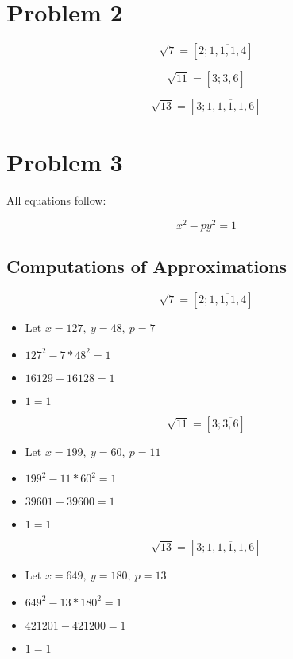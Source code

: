 \documentclass[]{report}
\begin{document}
\section{Problem 2}

$$ \sqrt{7} = [2; \overline{1, 1, 1, 4}] $$


$$ \sqrt{11} = [3; \overline{3, 6}] $$


$$ \sqrt{13} = [3;  \overline{1, 1, 1, 1, 6}] $$








\section{Problem 3}

All equations follow:

$$ x^2 - p y^2 = 1$$

\subsection{Computations of Approximations}

	$$ \sqrt{7} = [2; \overline{1, 1, 1, 4}] $$
\begin{itemize}

	
	\item Let $x = 127, \ y = 48, \ p = 7$

	\item $127^2 - 7 * 48^2 = 1$
	
	\item $ 16129 - 16128 = 1$
	
	\item $ 1 = 1$
	
\end{itemize}

 $$ \sqrt{11} = [3; \overline{3, 6}] $$

\begin{itemize}
	
	 	\item Let $x = 199, \ y = 60, \ p = 11$
	 
	 \item $199^2 - 11 * 60^2 = 1$
	 
	 \item $ 39601 - 39600 = 1$
	 
	 \item $ 1 = 1$
	 
\end{itemize}

 
	 
	 $$ \sqrt{13} = [3;  \overline{1, 1, 1, 1, 6}] $$

\begin{itemize}
	
	 	 
	 \item Let $x = 649, \ y = 180, \ p = 13$
	 
	 \item $649^2 - 13 * 180^2 = 1$
	 
	 \item $ 421201 - 421200 = 1$
	 
	 \item $ 1 = 1$
	 
	 
	 
	
	
\end{itemize}
\end{document}
